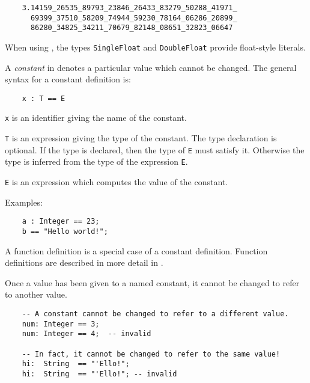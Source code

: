 \begin{small}
\begin{verbatim}
    3.14159_26535_89793_23846_26433_83279_50288_41971_
      69399_37510_58209_74944_59230_78164_06286_20899_
      86280_34825_34211_70679_82148_08651_32823_06647
\end{verbatim}
\end{small}

When using \libaldor{}, the types \verb"SingleFloat" and 
\verb"DoubleFloat" provide float-style literals.


A {\em constant\/} in \asharp{} denotes a particular value which
cannot be changed.  The general syntax for a constant definition is:

\begin{small}
\begin{verbatim}
    x : T == E
\end{verbatim}
\end{small}

\verb"x" is an identifier giving the name of the constant.

\verb"T" is an expression giving the type of the constant.
The type declaration is optional.  If the type is declared, then the
type of \verb"E" must satisfy it.  Otherwise the type is inferred
from the type of the expression \verb"E".

\verb"E" is an expression which computes the value of the constant.

Examples:

\begin{small}
\begin{verbatim}
    a : Integer == 23;
    b == "Hello world!";
\end{verbatim}
\end{small}

A function definition is a special case of a constant definition.
Function definitions are described in more detail in
.

Once a value has been given to a named constant, it cannot be
changed to refer to another value.

\begin{small}
\begin{verbatim}
    -- A constant cannot be changed to refer to a different value.
    num: Integer == 3;
    num: Integer == 4;  -- invalid

    -- In fact, it cannot be changed to refer to the same value!
    hi:  String  == "'Ello!";
    hi:  String  == "'Ello!"; -- invalid
\end{verbatim}
\end{small}

